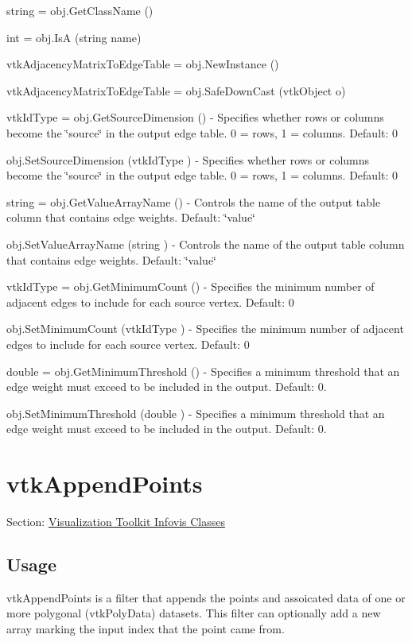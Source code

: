\begin{DoxyItemize}
\item {\ttfamily string = obj.\-Get\-Class\-Name ()}  
\item {\ttfamily int = obj.\-Is\-A (string name)}  
\item {\ttfamily vtk\-Adjacency\-Matrix\-To\-Edge\-Table = obj.\-New\-Instance ()}  
\item {\ttfamily vtk\-Adjacency\-Matrix\-To\-Edge\-Table = obj.\-Safe\-Down\-Cast (vtk\-Object o)}  
\item {\ttfamily vtk\-Id\-Type = obj.\-Get\-Source\-Dimension ()} -\/ Specifies whether rows or columns become the \char`\"{}source\char`\"{} in the output edge table. 0 = rows, 1 = columns. Default\-: 0  
\item {\ttfamily obj.\-Set\-Source\-Dimension (vtk\-Id\-Type )} -\/ Specifies whether rows or columns become the \char`\"{}source\char`\"{} in the output edge table. 0 = rows, 1 = columns. Default\-: 0  
\item {\ttfamily string = obj.\-Get\-Value\-Array\-Name ()} -\/ Controls the name of the output table column that contains edge weights. Default\-: \char`\"{}value\char`\"{}  
\item {\ttfamily obj.\-Set\-Value\-Array\-Name (string )} -\/ Controls the name of the output table column that contains edge weights. Default\-: \char`\"{}value\char`\"{}  
\item {\ttfamily vtk\-Id\-Type = obj.\-Get\-Minimum\-Count ()} -\/ Specifies the minimum number of adjacent edges to include for each source vertex. Default\-: 0  
\item {\ttfamily obj.\-Set\-Minimum\-Count (vtk\-Id\-Type )} -\/ Specifies the minimum number of adjacent edges to include for each source vertex. Default\-: 0  
\item {\ttfamily double = obj.\-Get\-Minimum\-Threshold ()} -\/ Specifies a minimum threshold that an edge weight must exceed to be included in the output. Default\-: 0.  
\item {\ttfamily obj.\-Set\-Minimum\-Threshold (double )} -\/ Specifies a minimum threshold that an edge weight must exceed to be included in the output. Default\-: 0.  
\end{DoxyItemize}\hypertarget{vtkinfovis_vtkappendpoints}{}\section{vtk\-Append\-Points}\label{vtkinfovis_vtkappendpoints}
Section\-: \hyperlink{sec_vtkinfovis}{Visualization Toolkit Infovis Classes} \hypertarget{vtkwidgets_vtkxyplotwidget_Usage}{}\subsection{Usage}\label{vtkwidgets_vtkxyplotwidget_Usage}
vtk\-Append\-Points is a filter that appends the points and assoicated data of one or more polygonal (vtk\-Poly\-Data) datasets. This filter can optionally add a new array marking the input index that the point came from.

